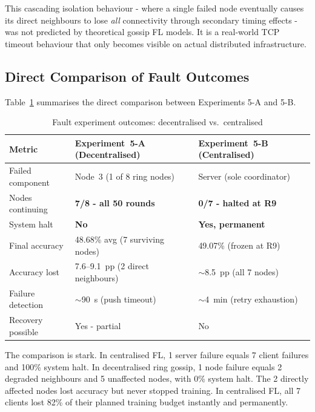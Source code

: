 \documentclass[12pt]{report}
\begin{document}
This cascading isolation behaviour - where a single failed node eventually
causes its direct neighbours to lose \textit{all} connectivity through secondary
timing effects - was not predicted by theoretical gossip FL models. It is a
real-world TCP timeout behaviour that only becomes visible on actual distributed
infrastructure.

\subsection{Direct Comparison of Fault Outcomes}

Table~\ref{tab:fault-comparison} summarises the direct comparison between
Experiments 5-A and 5-B.

\begin{table}[H]
\centering
\small
\begin{tabular}{lp{4.5cm}p{4.5cm}}
\toprule
\textbf{Metric}
  & \textbf{Experiment~5-A (Decentralised)}
  & \textbf{Experiment~5-B (Centralised)} \\
\midrule
Failed component   & Node~3 (1 of 8 ring nodes)     & Server (sole coordinator) \\
Nodes continuing   & \textbf{7/8 - all 50 rounds}  & \textbf{0/7 - halted at R9} \\
System halt        & \textbf{No}                     & \textbf{Yes, permanent} \\
Final accuracy     & 48.68\% avg (7 surviving nodes) & 49.07\% (frozen at R9) \\
Accuracy lost      & 7.6--9.1~pp (2 direct neighbours) & $\sim$8.5~pp (all 7 nodes) \\
Failure detection  & $\sim$90~s (push timeout)       & $\sim$4~min (retry exhaustion) \\
Recovery possible  & Yes - partial                  & No \\
\bottomrule
\end{tabular}
\vspace{0.5cm}
\caption{Fault experiment outcomes: decentralised vs.\ centralised}
\label{tab:fault-comparison}
\end{table}

The comparison is stark. In centralised FL, 1 server failure equals 7 client
failures and 100\% system halt. In decentralised ring gossip, 1 node failure
equals 2 degraded neighbours and 5 unaffected nodes, with 0\% system halt.
The 2 directly affected nodes lost accuracy but never stopped training. In
centralised FL, all 7 clients lost 82\% of their planned training budget
instantly and permanently.
\end{document}
